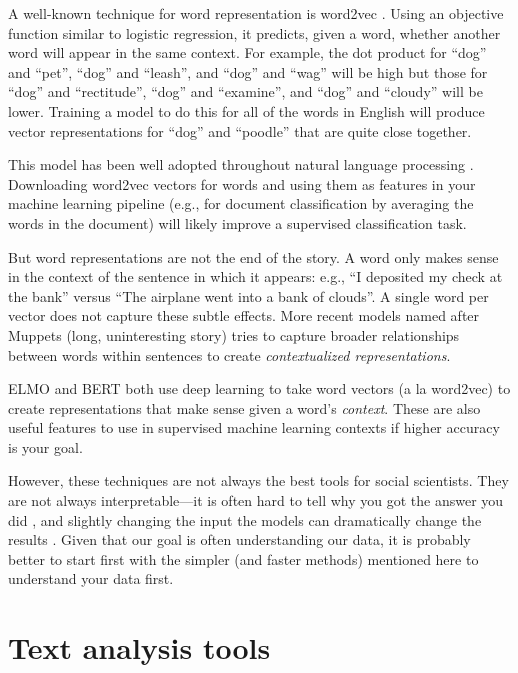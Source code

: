 \documentclass[]{krantz}
\begin{document}
A well-known technique for word representation is word2vec
\citep{mikolov-13}. Using an objective function similar to logistic
regression, it predicts, given a word, whether another word will appear
in the same context. For example, the dot product for ``dog'' and
``pet'', ``dog'' and ``leash'', and ``dog'' and ``wag'' will be high but
those for ``dog'' and ``rectitude'', ``dog'' and ``examine'', and
``dog'' and ``cloudy'' will be lower. Training a model to do this for
all of the words in English will produce vector representations for
``dog'' and ``poodle'' that are quite close together.

This model has been well adopted throughout natural language processing
\citep{church-17}. Downloading word2vec vectors for words and using them
as features in your machine learning pipeline (e.g., for document
classification by averaging the words in the document) will likely
improve a supervised classification task.

But word representations are not the end of the story. A word only makes
sense in the context of the sentence in which it appears: e.g., ``I
deposited my check at the bank'' versus ``The airplane went into a bank
of clouds''. A single word per vector does not capture these subtle
effects. More recent models named after Muppets (long, uninteresting
story) tries to capture broader relationships between words within
sentences to create \emph{contextualized representations}.

ELMO \citep{peters-18} and BERT \citep{devlin-18} both use deep learning
to take word vectors (a la word2vec) to create representations that make
sense given a word's \emph{context}. These are also useful features to
use in supervised machine learning contexts if higher accuracy is your
goal.

However, these techniques are not always the best tools for social
scientists. They are not always interpretable---it is often hard to tell
why you got the answer you did \citep{ribeiro-16}, and slightly changing
the input the models can dramatically change the results
\citep{feng-18}. Given that our goal is often understanding our data, it
is probably better to start first with the simpler (and faster methods)
mentioned here to understand your data first.

\section{Text analysis tools}\label{text-analysis-tools}
\end{document}
